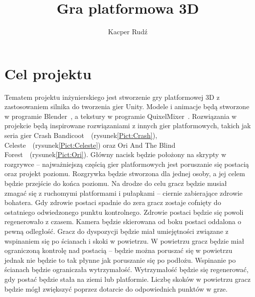\documentclass[12pt,twoside]{article}
\author{Kacper Rudź}
\title{Gra platformowa 3D}
\begin{document}
\maketitle

\blankpage

\tableofcontents

\clearpage
\blankpage




\section{Cel projektu}
Tematem projektu inżynierskiego jest stworzenie gry platformowej 3D z
zastosowaniem silnika do tworzenia gier Unity. Modele i animacje będą stworzone
w programie Blender~\cite{blender_URL}, a tekstury w programie
QuixelMixer~\cite{QuixelMixer}. Rozwiązania w projekcie będą inspirowane
rozwiązaniami z innych gier platformowych, takich jak seria gier Crash
Bandicoot~\cite{SteamCrash}~(rysunek\ref{Pict:Crash}), Celeste~\cite{SteamCeleste}~(rysunek\ref{Pict:Celeste}) oraz Ori
And The Blind Forest~\cite{SteamOri}~(rysunek\ref{Pict:Ori}). Główny nacisk będzie położony na
skrypty w rozgrywce -- najważniejszą częścią gier platformowych jest poruszanie
się postacią oraz projekt poziomu.  
Rozgrywka będzie stworzona dla jednej osoby, a jej celem będzie przejście do
końca poziomu. Na drodze do celu gracz będzie musiał zmagać się z ruchomymi
platformami i pułapkami -- ciernie zabierające zdrowie bohatera. Gdy zdrowie
postaci spadnie do zera gracz zostaje cofnięty do ostatniego odwiedzonego punktu
kontrolnego. Zdrowie postaci będzie się powoli regenerowało z czasem. Kamera
będzie skierowana od boku postaci oddalona o pewną odległość. Gracz do
dyspozycji będzie miał umiejętności związane z wspinaniem się po ścianach i
skoki w powietrzu. W powietrzu gracz będzie miał ograniczoną kontrolę nad
postacią -- będzie można poruszać się w powietrzu jednak nie będzie to tak
płynne jak poruszanie się po podłożu. Wspinanie po ścianach będzie ograniczała
wytrzymałość. Wytrzymałość będzie się regenerować, gdy postać będzie stała na
ziemi lub platformie. Liczbę skoków w powietrzu gracz będzie mógł zwiększyć
poprzez dotarcie do odpowiednich punktów w grze. 
\end{document}
